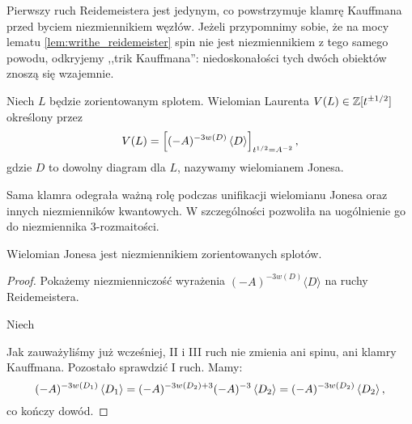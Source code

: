 Pierwszy ruch Reidemeistera jest jedynym, co powstrzymuje klamrę Kauffmana przed byciem niezmiennikiem węzłów.
Jeżeli przypomnimy sobie, że na mocy lematu \ref{lem:writhe_reidemeister} spin nie jest niezmiennikiem z tego samego powodu, odkryjemy ,,trik Kauffmana'': niedoskonałości tych dwóch obiektów znoszą się wzajemnie.
%
%

\begin{definition}
\label{def:jones_polynomial}%
    Niech $L$ będzie zorientowanym splotem.
    Wielomian Laurenta $V(L) \in \mathbb Z[t^{\pm 1/2}]$ określony przez
    \begin{equation}
        V(L)=\left[(-A)^{-3w(D)} \left\langle{D}\right\rangle\right]_{t^{1/2}=A^{-2}},
    \end{equation}
    gdzie $D$ to dowolny diagram dla $L$, nazywamy wielomianem Jonesa.
\end{definition}

Sama klamra odegrała ważną rolę podczas unifikacji wielomianu Jonesa oraz innych niezmienników kwantowych.
W szczególności pozwoliła na uogólnienie go do niezmiennika 3-rozmaitości.

\begin{proposition}
    Wielomian Jonesa jest niezmiennikiem zorientowanych splotów.
\end{proposition}

\begin{proof}
    Pokażemy niezmienniczość wyrażenia $(-A)^{-3w(D)}\langle D\rangle$ na ruchy Reidemeistera.

    Niech
\begin{comment}
    \begin{equation}
        D_1 = \LargeReidemeisterOneLeft,
        \quad\quad\quad
        D_2 = \LargeReidemeisterOneStraight
    \end{equation}
\end{comment}
    Jak zauważyliśmy już wcześniej, II i III ruch nie zmienia ani spinu, ani klamry Kauffmana.
    Pozostało sprawdzić I ruch.
    Mamy:
    \begin{equation}
        (-A)^{-3 w\left(D_1\right)} \left\langle{D_1}\right\rangle =
        (-A)^{-3 w\left(D_2\right) + 3} (-A)^{-3}\left\langle{D_2}\right\rangle =
        (-A)^{-3 w\left(D_2\right)} \left\langle{D_2}\right\rangle,
    \end{equation}
    co kończy dowód.
\end{proof}

